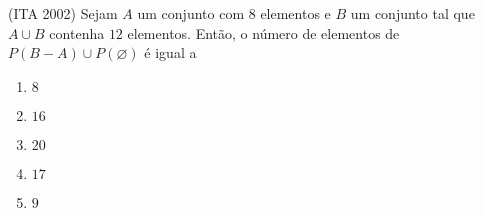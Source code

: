 \item
(ITA 2002) Sejam $A$ um conjunto com $8$ elementos e $B$ um conjunto tal que $A \cup B$ contenha $12$ elementos. Então, o número
de elementos de $P(B - A) \cup P(\varnothing)$ é igual a
\begin{multicols}{5}
\begin{enumerate}
\item $8$
\item $16$
\item $20$
\item $17$%
\item $9$
\end{enumerate}
\end{multicols}
